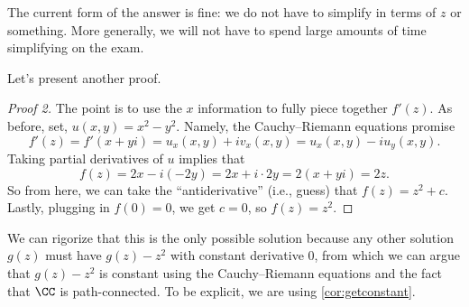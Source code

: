 \begin{remark}
	The current form of the answer is fine: we do not have to simplify in terms of $z$ or something. More generally, we will not have to spend large amounts of time simplifying on the exam.
\end{remark}
Let's present another proof.
\begin{proof}[Proof 2]
	The point is to use the $x$ information to fully piece together $f'(z)$. As before, set, $u(x,y)=x^2-y^2$. Namely, the Cauchy--Riemann equations promise
	\[f'(z)=f'(x+yi)=u_x(x,y)+iv_x(x,y)=u_x(x,y)-iu_y(x,y).\]
	Taking partial derivatives of $u$ implies that
	\[f(z)=2x-i(-2y)=2x+i\cdot 2y=2(x+yi)=2z.\]
	So from here, we can take the ``antiderivative'' (i.e., guess) that $f(z)=z^2+c$. Lastly, plugging in $f(0)=0$, we get $c=0$, so $\boxed{f(z)=z^2}$.
\end{proof}
\begin{remark}
	We can rigorize that this is the only possible solution because any other solution $g(z)$ must have $g(z)-z^2$ with constant derivative $0$, from which we can argue that $g(z)-z^2$ is constant using the Cauchy--Riemann equations and the fact that $\CC$ is path-connected. To be explicit, we are using \autoref{cor:getconstant}.
\end{remark}